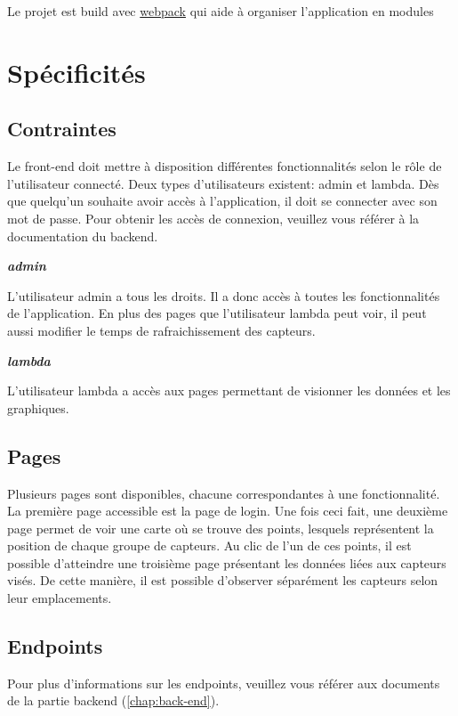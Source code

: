 Le projet est build avec \href{https://webpack.js.org/}{webpack} qui aide à organiser l'application en modules

\section{Spécificités}

\subsection{Contraintes}

Le front-end doit mettre à disposition différentes fonctionnalités selon le rôle de l'utilisateur connecté. Deux types d'utilisateurs existent: admin et lambda. Dès que quelqu'un souhaite avoir accès à l'application, il doit se connecter avec son mot de passe. Pour obtenir les accès de connexion, veuillez vous référer à la documentation du backend.

\textbf{\emph{admin}}

L'utilisateur admin a tous les droits. Il a donc accès à toutes les fonctionnalités de l'application. En plus des pages que l'utilisateur lambda peut voir, il peut aussi modifier le temps de rafraichissement des capteurs.
\vspace{5mm}

\textbf{\emph{lambda}}

L'utilisateur lambda a accès aux pages permettant de visionner les données et les graphiques.

\subsection{Pages}

Plusieurs pages sont disponibles, chacune correspondantes à une fonctionnalité. La première page accessible est la page de login. Une fois ceci fait, une deuxième page permet de voir une carte où se trouve des points, lesquels représentent la position de chaque groupe de capteurs. Au clic de l'un de ces points, il est possible d'atteindre une troisième page présentant les données liées aux capteurs visés. De cette manière, il est possible d'observer séparément les capteurs selon leur emplacements.

\subsection{Endpoints}

Pour plus d'informations sur les endpoints, veuillez vous référer aux documents de la partie backend (\autoref{chap:back-end}).

